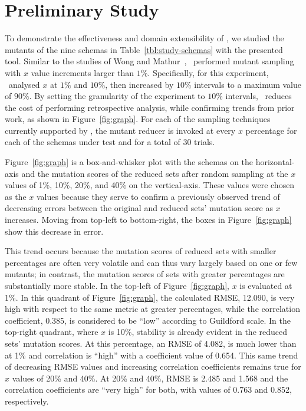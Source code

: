 \vspace*{-.25em}

\section{Preliminary Study}


To demonstrate the effectiveness and domain extensibility of \mrstudyr, we studied the mutants of the nine schemas in
Table~\ref{tbl:study-schemas} with the presented tool. Similar to the studies of Wong and
Mathur~\cite{mathur1994empirical}, \mr~performed mutant sampling with $x$ value increments larger than $1\%$.
Specifically, for this experiment, \mr~analysed $x$ at $1\%$ and $10\%$, then increased by $10\%$ intervals to a maximum
value of $90\%$. By setting the granularity of the experiment to $10\%$ intervals, \mr~reduces the cost of performing
retrospective analysis, while confirming trends from prior work, as shown in Figure~\ref{fig:graph}. For each of the
sampling techniques currently supported by \mr, the mutant reducer is invoked at every $x$ percentage for each of the
schemas under test and for a total of 30 trials.


Figure~\ref{fig:graph} is a box-and-whisker plot with the schemas on the horizontal-axis and the mutation scores of the reduced
sets after random sampling at the $x$ values of 1\%, 10\%, 20\%, and 40\% on the vertical-axis.  These values were chosen as the
$x$ values because they serve to confirm a previously observed trend of decreasing errors between the original and reduced sets'
mutation score as $x$ increases. Moving from top-left to bottom-right, the boxes in Figure~\ref{fig:graph} show this decrease in
error.



This trend occurs because the mutation scores of reduced sets with smaller percentages are often very volatile and can
thus vary largely based on one or few mutants; in contrast, the mutation scores of sets with greater percentages are
substantially more stable. In the top-left of Figure~\ref{fig:graph}, $x$ is evaluated at 1\%. In this quadrant of
Figure~\ref{fig:graph}, the calculated RMSE, 12.090, is very high with respect to the same metric at greater
percentages, while the correlation coefficient, 0.385, is considered to be ``low'' according to Guildford scale. In
the top-right quadrant, where $x$ is 10\%, stability is already evident in the reduced sets' mutation scores. At this
percentage, an RMSE of 4.082, is much lower than at 1\% and correlation is ``high'' with a coefficient value of 0.654.
This same trend of decreasing RMSE values and increasing correlation coefficients remains true for $x$ values of 20\%
and 40\%. At 20\% and 40\%, RMSE is 2.485 and 1.568 and the correlation coefficients are ``very high'' for both,
with values of 0.763 and 0.852, respectively.

